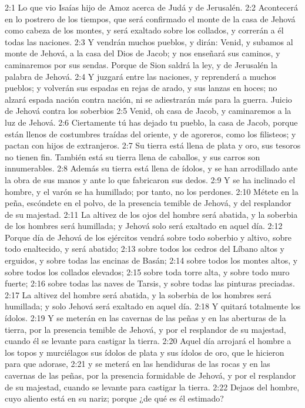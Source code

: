  
2:1 Lo que vio Isaías hijo de Amoz acerca de Judá y de Jerusalén. 
2:2 Acontecerá en lo postrero de los tiempos, que será confirmado el monte de la casa de Jehová como cabeza de los montes, y será exaltado sobre los collados, y correrán a él todas las naciones. 
2:3 Y vendrán muchos pueblos, y dirán: Venid, y subamos al monte de Jehová, a la casa del Dios de Jacob; y nos enseñará sus caminos, y caminaremos por sus sendas. Porque de Sion saldrá la ley, y de Jerusalén la palabra de Jehová. 
2:4 Y juzgará entre las naciones, y reprenderá a muchos pueblos; y volverán sus espadas en rejas de arado, y sus lanzas en hoces; no alzará espada nación contra nación, ni se adiestrarán más para la guerra. 
Juicio de Jehová contra los soberbios 
2:5 Venid, oh casa de Jacob, y caminaremos a la luz de Jehová. 
2:6 Ciertamente tú has dejado tu pueblo, la casa de Jacob, porque están llenos de costumbres traídas del oriente, y de agoreros, como los filisteos; y pactan con hijos de extranjeros. 
2:7 Su tierra está llena de plata y oro, sus tesoros no tienen fin. También está su tierra llena de caballos, y sus carros son innumerables. 
2:8 Además su tierra está llena de ídolos, y se han arrodillado ante la obra de sus manos y ante lo que fabricaron sus dedos. 
2:9 Y se ha inclinado el hombre, y el varón se ha humillado; por tanto, no los perdones. 
2:10 Métete en la peña, escóndete en el polvo, de la presencia temible de Jehová, y del resplandor de su majestad. 
2:11 La altivez de los ojos del hombre será abatida, y la soberbia de los hombres será humillada; y Jehová solo será exaltado en aquel día. 
2:12 Porque día de Jehová de los ejércitos vendrá sobre todo soberbio y altivo, sobre todo enaltecido, y será abatido; 
2:13 sobre todos los cedros del Líbano altos y erguidos, y sobre todas las encinas de Basán; 
2:14 sobre todos los montes altos, y sobre todos los collados elevados; 
2:15 sobre toda torre alta, y sobre todo muro fuerte; 
2:16 sobre todas las naves de Tarsis, y sobre todas las pinturas preciadas. 
2:17 La altivez del hombre será abatida, y la soberbia de los hombres será humillada; y solo Jehová será exaltado en aquel día. 
2:18 Y quitará totalmente los ídolos. 
2:19 Y se meterán en las cavernas de las peñas y en las aberturas de la tierra, por la presencia temible de Jehová, y por el resplandor de su majestad, cuando él se levante para castigar la tierra. 
2:20 Aquel día arrojará el hombre a los topos y murciélagos sus ídolos de plata y sus ídolos de oro, que le hicieron para que adorase, 
2:21 y se meterá en las hendiduras de las rocas y en las cavernas de las peñas, por la presencia formidable de Jehová, y por el resplandor de su majestad, cuando se levante para castigar la tierra. 
2:22 Dejaos del hombre, cuyo aliento está en su nariz; porque ¿de qué es él estimado? 
